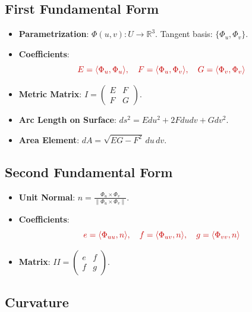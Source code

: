 \documentclass[a4paper,12pt]{article}
\newcommand{\key}[1]{\textcolor{keywordcolor}{\textbf{#1}}}
\newcommand{\formula}[1]{\textcolor{formulacolor}{#1}}
\begin{document}
\subsection{First Fundamental Form}

\begin{itemize}
    \item \key{Parametrization}: $\Phi(u, v) : U \to \mathbb{R}^3$. Tangent basis: $\{\Phi_u, \Phi_v\}$.
    \item \key{Coefficients}:
    \begin{equation}
        \formula{E = \langle \Phi_u, \Phi_u \rangle, \quad F = \langle \Phi_u, \Phi_v \rangle, \quad G = \langle \Phi_v, \Phi_v \rangle}
    \end{equation}
    \item \key{Metric Matrix}: $I = \begin{pmatrix} E & F \\ F & G \end{pmatrix}$.
    \item \key{Arc Length on Surface}: $ds^2 = E du^2 + 2F du dv + G dv^2$.
    \item \key{Area Element}: $dA = \sqrt{EG - F^2} \, du \, dv$.
\end{itemize}

\subsection{Second Fundamental Form}

\begin{itemize}
    \item \key{Unit Normal}: $n = \frac{\Phi_u \times \Phi_v}{\|\Phi_u \times \Phi_v\|}$.
    \item \key{Coefficients}:
    \begin{equation}
        \formula{e = \langle \Phi_{uu}, n \rangle, \quad f = \langle \Phi_{uv}, n \rangle, \quad g = \langle \Phi_{vv}, n \rangle}
    \end{equation}
    \item \key{Matrix}: $II = \begin{pmatrix} e & f \\ f & g \end{pmatrix}$.
\end{itemize}

\subsection{Curvature}
\end{document}
